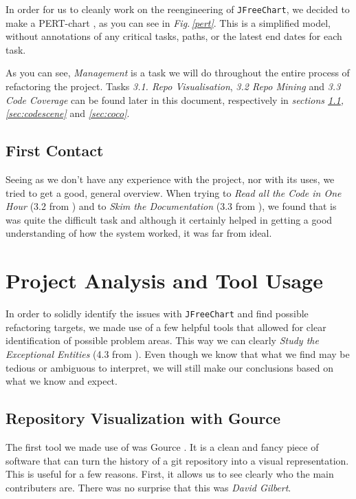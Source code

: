 \documentclass[11pt]{article}
\begin{document}
	In order for us to cleanly work on the reengineering of \texttt{JFreeChart}, we decided to make a \textsf{PERT}-chart \cite{pert}, as you can see in \textsl{Fig.\,\ref{pert}}. This is a simplified model, without annotations of any critical tasks, paths, or the latest end dates for each task. 
   
	As you can see, \textsl{Management} is a task we will do throughout the entire process of refactoring the project. Tasks \textsl{3.1. Repo Visualisation}, \textsl{3.2 Repo Mining} and \textsl{3.3 Code Coverage} can be found later in this document, respectively in \textsl{sections \ref{sec:gource}, \ref{sec:codescene}} and \textsl{\ref{sec:coco}}. 
   
	
	\subsection{First Contact}
	Seeing as we don't have any experience with the project, nor with its uses, we tried to get a good, general overview. When trying to \textsl{Read all the Code in One Hour} (3.2 from \cite{demeyer2009object}) and to \textsl{Skim the Documentation} (3.3 from \cite{demeyer2009object}), we found that is was quite the difficult task and although it certainly helped in getting a good understanding of how the system worked, it was far from ideal.
	
	
	\section{Project Analysis and Tool Usage}
	In order to solidly identify the issues with \texttt{JFreeChart} and find possible refactoring targets, we made use of a few helpful tools that allowed for clear identification of possible problem areas. This way we can clearly \textsl{Study the Exceptional Entities} (4.3 from \cite{demeyer2009object}). Even though we know that what we find may be tedious or ambiguous to interpret, we will still make our conclusions based on what we know and expect.
	
	\subsection{Repository Visualization with Gource}
	\label{sec:gource}
	The first tool we made use of was \textsf{Gource} \cite{gource}. It is a clean and fancy piece of software that can turn the history of a git repository into a visual representation. This is useful for a few reasons. First, it allows us to see clearly who the main contributers are. There was no surprise that this was \textsl{David Gilbert}.
	
\end{document}
